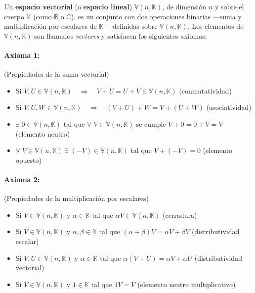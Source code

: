 \documentclass[../apunte_mecanica_clasica.tex]{subfiles}%
\begin{document}
Un \textbf{espacio vectorial} (o \textbf{espacio lineal}) $\mathbb{V}(n, \mathbb{K})$, de dimensión $n$ y sobre el cuerpo $\mathbb{K}$ (como $\mathbb{R}$ o $\mathbb{C}$), es un conjunto con dos operaciones binarias —suma y multiplicación por escalares de $\mathbb{K}$— definidas sobre $\mathbb{V}(n, \mathbb{K})$. Los elementos de $\mathbb{V}(n, \mathbb{K})$ son llamados \textit{vectores} y satisfacen los siguientes axiomas:

\paragraph{Axioma 1:} (Propiedades de la suma vectorial)
\begin{itemize}
    \item Si $V, U \in \mathbb{V}(n, \mathbb{K}) \quad \Rightarrow \quad V + U = U + V \in \mathbb{V}(n, \mathbb{K})$ \hfill (conmutatividad)
    \item Si $V, U, W \in \mathbb{V}(n, \mathbb{K}) \quad \Rightarrow \quad (V + U) + W = V + (U + W)$ \hfill (asociatividad)
    \item $\exists \;0 \in \mathbb{V}(n, \mathbb{K})$ tal que $\forall \; V \in\mathbb{V}(n, \mathbb{K})$ se cumple $V + 0 = 0 + V = V$ \hfill (elemento neutro)
    \item $\forall \;V \in \mathbb{V}(n, \mathbb{K}) \;\exists\;(-V )\in \mathbb{V}(n, \mathbb{K})$ tal que $V + (-V) = 0$ \hfill (elemento opuesto)
\end{itemize}

\paragraph{Axioma 2:} (Propiedades de la multiplicación por escalares)
\begin{itemize}
    \item Si $V \in \mathbb{V}(n, \mathbb{K})$ y $\alpha \in \mathbb{K}$ tal que $\alpha V \in \mathbb{V}(n, \mathbb{K})$ \hfill (cerradura)
    \item Si $V \in \mathbb{V}(n, \mathbb{K})$ y $\alpha, \beta \in \mathbb{K}$ tal que $(\alpha + \beta)V = \alpha V + \beta V$ \hfill (distributividad escalar)
    \item Si $V, U \in \mathbb{V}(n, \mathbb{K})$ y $\alpha \in \mathbb{K}$ tal que $\alpha(V + U) = \alpha V + \alpha U$ \hfill (distributividad vectorial)
    \item Si $V \in \mathbb{V}(n, \mathbb{K})$ y $1 \in \mathbb{K}$ tal que $1V = V$ \hfill (elemento neutro multiplicativo)
\end{itemize}
\end{document}
